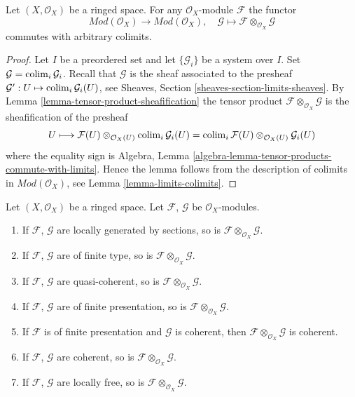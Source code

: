 \begin{lemma}
\label{lemma-tensor-commute-colimits}
Let $(X, \mathcal{O}_X)$ be a ringed space.
For any $\mathcal{O}_X$-module $\mathcal{F}$ the functor
$$
\textit{Mod}(\mathcal{O}_X) \longrightarrow \textit{Mod}(\mathcal{O}_X)
, \quad
\mathcal{G} \longmapsto \mathcal{F} \otimes_{\mathcal{O}_X} \mathcal{G}
$$
commutes with arbitrary colimits.
\end{lemma}

\begin{proof}
Let $I$ be a preordered set and let $\{\mathcal{G}_i\}$ be
a system over $I$. Set $\mathcal{G} = \mathop{\mathrm{colim}}\nolimits_i \mathcal{G}_i$.
Recall that $\mathcal{G}$ is the sheaf associated to the presheaf
$\mathcal{G}' : U \mapsto \mathop{\mathrm{colim}}\nolimits_i \mathcal{G}_i(U)$, see
Sheaves, Section \ref{sheaves-section-limits-sheaves}.
By
Lemma \ref{lemma-tensor-product-sheafification}
the tensor product $\mathcal{F} \otimes_{\mathcal{O}_X} \mathcal{G}$
is the sheafification of the presheaf
$$
U \longmapsto
\mathcal{F}(U) \otimes_{\mathcal{O}_X(U)} \mathop{\mathrm{colim}}\nolimits_i \mathcal{G}_i(U) =
\mathop{\mathrm{colim}}\nolimits_i \mathcal{F}(U) \otimes_{\mathcal{O}_X(U)} \mathcal{G}_i(U)
$$
where the equality sign is
Algebra, Lemma \ref{algebra-lemma-tensor-products-commute-with-limits}.
Hence the lemma follows from the description of colimits in
$\textit{Mod}(\mathcal{O}_X)$, see Lemma \ref{lemma-limits-colimits}.
\end{proof}

\begin{lemma}
\label{lemma-tensor-product-permanence}
\begin{reference}
\cite[Chapter I, \S 2, no. 14, Proposition 4, p. 209]{FAC}
\end{reference}
Let $(X, \mathcal{O}_X)$ be a ringed space.
Let $\mathcal{F}$, $\mathcal{G}$ be $\mathcal{O}_X$-modules.
\begin{enumerate}
\item If $\mathcal{F}$, $\mathcal{G}$ are locally generated
by sections, so is $\mathcal{F} \otimes_{\mathcal{O}_X} \mathcal{G}$.
\item If $\mathcal{F}$, $\mathcal{G}$ are of finite type,
so is $\mathcal{F} \otimes_{\mathcal{O}_X} \mathcal{G}$.
\item If $\mathcal{F}$, $\mathcal{G}$ are quasi-coherent,
so is $\mathcal{F} \otimes_{\mathcal{O}_X} \mathcal{G}$.
\item If $\mathcal{F}$, $\mathcal{G}$ are of finite presentation,
so is $\mathcal{F} \otimes_{\mathcal{O}_X} \mathcal{G}$.
\item If $\mathcal{F}$ is of finite presentation and $\mathcal{G}$ is coherent,
then $\mathcal{F} \otimes_{\mathcal{O}_X} \mathcal{G}$ is coherent.
\item If $\mathcal{F}$, $\mathcal{G}$ are coherent,
so is $\mathcal{F} \otimes_{\mathcal{O}_X} \mathcal{G}$.
\item If $\mathcal{F}$, $\mathcal{G}$ are locally free,
so is $\mathcal{F} \otimes_{\mathcal{O}_X} \mathcal{G}$.
\end{enumerate}
\end{lemma}

